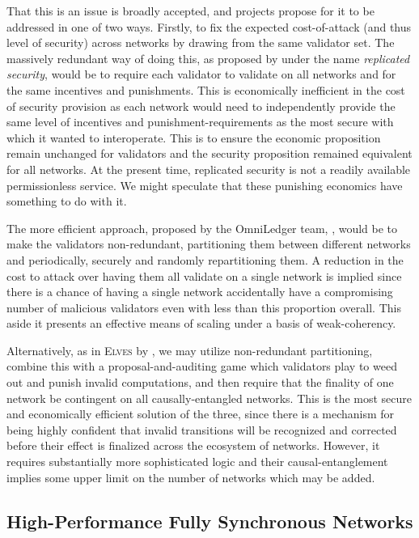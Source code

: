 That this is an issue is broadly accepted, and projects propose for it to be addressed in one of two ways. Firstly, to fix the expected cost-of-attack (and thus level of security) across networks by drawing from the same validator set. The massively redundant way of doing this, as proposed by \cite{cosmos2024interchain} under the name \emph{replicated security}, would be to require each validator to validate on all networks and for the same incentives and punishments. This is economically inefficient in the cost of security provision as each network would need to independently provide the same level of incentives and punishment-requirements as the most secure with which it wanted to interoperate. This is to ensure the economic proposition remain unchanged for validators and the security proposition remained equivalent for all networks. At the present time, replicated security is not a readily available permissionless service. We might speculate that these punishing economics have something to do with it.

The more efficient approach, proposed by the OmniLedger team, \cite{cryptoeprint:2017/406}, would be to make the validators non-redundant, partitioning them between different networks and periodically, securely and randomly repartitioning them. A reduction in the cost to attack over having them all validate on a single network is implied since there is a chance of having a single network accidentally have a compromising number of malicious validators even with less than this proportion overall. This aside it presents an effective means of scaling under a basis of weak-coherency.

Alternatively, as in \textsc{Elves} by \cite{cryptoeprint:2024/961}, we may utilize non-redundant partitioning, combine this with a proposal-and-auditing game which validators play to weed out and punish invalid computations, and then require that the finality of one network be contingent on all causally-entangled networks. This is the most secure and economically efficient solution of the three, since there is a mechanism for being highly confident that invalid transitions will be recognized and corrected before their effect is finalized across the ecosystem of networks. However, it requires substantially more sophisticated logic and their causal-entanglement implies some upper limit on the number of networks which may be added.

\subsection{High-Performance Fully Synchronous Networks}

